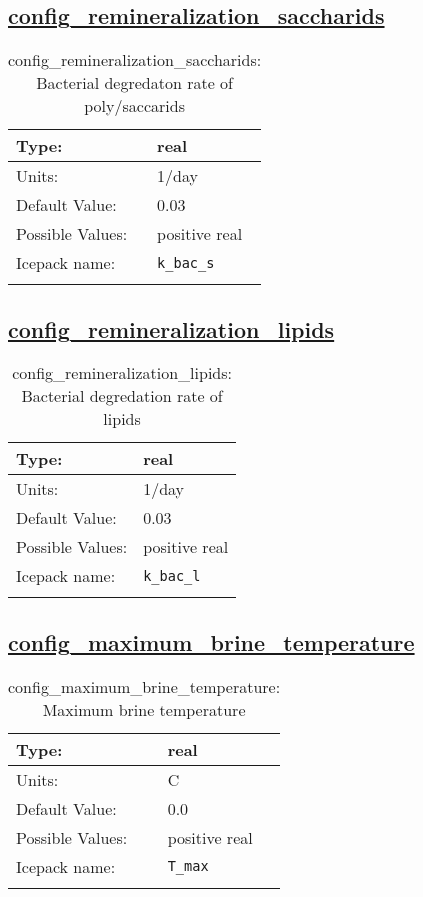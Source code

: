 \subsection[config\_remineralization\_saccharids]{\hyperref[sec:nm_tab_biogeochemistry]{config\_remineralization\_saccharids}}
\label{subsec:nm_sec_config_remineralization_saccharids}
\begin{center}
\begin{longtable}{| p{2.0in} || p{4.0in} |}
    \hline
    Type: & real \\
    \hline
    Units: & \si{1/day} \\
    \hline
    Default Value: & 0.03 \\
    \hline
    Possible Values: & positive real \\
    \hline
    Icepack name: & \verb+k_bac_s+ \\
    \hline
    \caption{config\_remineralization\_saccharids: Bacterial degredaton rate of poly/saccarids}
\end{longtable}
\end{center}
\subsection[config\_remineralization\_lipids]{\hyperref[sec:nm_tab_biogeochemistry]{config\_remineralization\_lipids}}
\label{subsec:nm_sec_config_remineralization_lipids}
\begin{center}
\begin{longtable}{| p{2.0in} || p{4.0in} |}
    \hline
    Type: & real \\
    \hline
    Units: & \si{1/day} \\
    \hline
    Default Value: & 0.03 \\
    \hline
    Possible Values: & positive real \\
    \hline
    Icepack name: & \verb+k_bac_l+ \\
    \hline
    \caption{config\_remineralization\_lipids: Bacterial degredation rate of lipids}
\end{longtable}
\end{center}
\subsection[config\_maximum\_brine\_temperature]{\hyperref[sec:nm_tab_biogeochemistry]{config\_maximum\_brine\_temperature}}
\label{subsec:nm_sec_config_maximum_brine_temperature}
\begin{center}
\begin{longtable}{| p{2.0in} || p{4.0in} |}
    \hline
    Type: & real \\
    \hline
    Units: & \si{C} \\
    \hline
    Default Value: & 0.0 \\
    \hline
    Possible Values: & positive real \\
    \hline
    Icepack name: & \verb+T_max+ \\
    \hline
    \caption{config\_maximum\_brine\_temperature: Maximum brine temperature}
\end{longtable}
\end{center}
